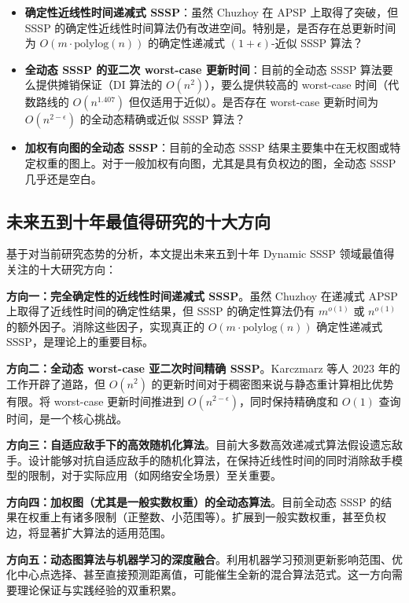 \documentclass[12pt,a4paper]{ctexart}
\begin{document}
\begin{itemize}
\item \textbf{确定性近线性时间递减式 SSSP}：虽然 Chuzhoy 在 APSP 上取得了突破，但 SSSP 的确定性近线性时间算法仍有改进空间。特别是，是否存在总更新时间为 $O(m\cdot\text{polylog}(n))$ 的确定性递减式 $(1+\epsilon)$-近似 SSSP 算法？
\item \textbf{全动态 SSSP 的亚二次 worst-case 更新时间}：目前的全动态 SSSP 算法要么提供摊销保证（DI 算法的 $O(n^2)$），要么提供较高的 worst-case 时间（代数路线的 $O(n^{1.407})$ 但仅适用于近似）。是否存在 worst-case 更新时间为 $O(n^{2-\epsilon})$ 的全动态精确或近似 SSSP 算法？
\item \textbf{加权有向图的全动态 SSSP}：目前的全动态 SSSP 结果主要集中在无权图或特定权重的图上。对于一般加权有向图，尤其是具有负权边的图，全动态 SSSP 几乎还是空白。

\end{itemize}
\subsection{未来五到十年最值得研究的十大方向}

基于对当前研究态势的分析，本文提出未来五到十年 Dynamic SSSP 领域最值得关注的十大研究方向：

\textbf{方向一：完全确定性的近线性时间递减式 SSSP}。虽然 Chuzhoy 在递减式 APSP 上取得了近线性时间的确定性结果，但 SSSP 的确定性算法仍有 $m^{o(1)}$ 或 $n^{o(1)}$ 的额外因子。消除这些因子，实现真正的 $O(m\cdot\text{polylog}(n))$ 确定性递减式 SSSP，是理论上的重要目标。

\textbf{方向二：全动态 worst-case 亚二次时间精确 SSSP}。Karczmarz 等人 2023 年的工作开辟了道路，但 $O(n^2)$ 的更新时间对于稠密图来说与静态重计算相比优势有限。将 worst-case 更新时间推进到 $O(n^{2-\epsilon})$，同时保持精确度和 $O(1)$ 查询时间，是一个核心挑战。

\textbf{方向三：自适应敌手下的高效随机化算法}。目前大多数高效递减式算法假设遗忘敌手。设计能够对抗自适应敌手的随机化算法，在保持近线性时间的同时消除敌手模型的限制，对于实际应用（如网络安全场景）至关重要。

\textbf{方向四：加权图（尤其是一般实数权重）的全动态算法}。目前全动态 SSSP 的结果在权重上有诸多限制（正整数、小范围等）。扩展到一般实数权重，甚至负权边，将显著扩大算法的适用范围。

\textbf{方向五：动态图算法与机器学习的深度融合}。利用机器学习预测更新影响范围、优化中心点选择、甚至直接预测距离值，可能催生全新的混合算法范式。这一方向需要理论保证与实践经验的双重积累。
\end{document}
